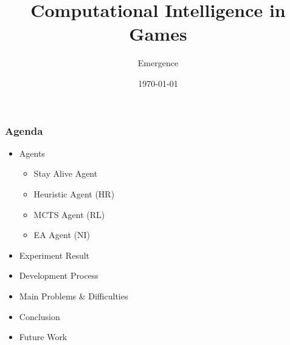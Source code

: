 \documentclass{beamer}
\title{Computational Intelligence in Games}
\author{Emergence}
\date{\today}
\institute{Otto-von-Guericke-University Magdeburg}
\begin{document}
\begin{frame}[plain]
 \titlepage
\end{frame}


\begin{frame}
\frametitle{Agenda}
\begin{itemize}
\item Agents
\begin{itemize}
\item Stay Alive Agent
\item Heuristic Agent (HR)
\item MCTS Agent (RL)
\item EA Agent (NI)
\end{itemize}
\item Experiment Result
\item Development Process
\item Main Problems \& Difficulties
\item Conclusion
\item Future Work
\end{itemize}
\end{frame}
\end{document}
